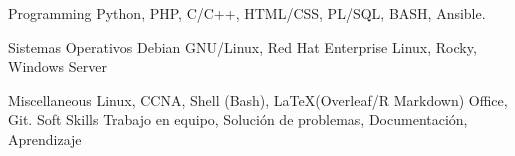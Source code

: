 

\begin{cvskills}

\cvskill
{Programming} %
{Python, PHP, C/C++, HTML/CSS, PL/SQL, BASH, Ansible.} %


\cvskill
{Sistemas Operativos} %
{Debian GNU/Linux, Red Hat Enterprise Linux, Rocky, Windows Server} %


\cvskill
{Miscellaneous} %
{Linux, CCNA, Shell (Bash), \LaTeX (Overleaf/R Markdown) Office, Git.} %
\cvskill
{Soft Skills} %
{Trabajo en equipo, Solución de problemas, Documentación, Aprendizaje} %

\end{cvskills}

